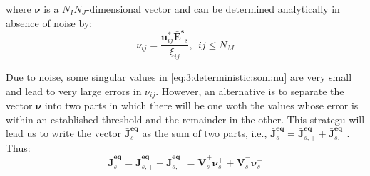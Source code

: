 			\noindent where $\boldsymbol{\nu}$ is a $N_IN_J$-dimensional vector and can be determined analytically in absence of noise by:
			\begin{equation}
				\nu_{ij} = \frac{\mathbf{u}^{\mathbf{*}}_{ij}\mathbf{\bar{E}^s}_s}{\xi_{ij}},~~ij\le N_M \label{eq:3:deterministic:som:nu}
			\end{equation}
		
			Due to noise, some singular values in \eqref{eq:3:deterministic:som:nu} are very small and lead to very large errors in $\nu_{ij}$. However, an alternative is to separate the vector $\boldsymbol{\nu}$ into two parts in which there will be one woth the values whose error is within an established threshold and the remainder in the other. This strategu will lead us to write the vector $\mathbf{\bar{J}}^{\mathbf{eq}}_s$ as the sum of two parts, i.e., $\mathbf{\bar{J}}^{\mathbf{eq}}_s = \mathbf{\bar{J}}^{\mathbf{eq}}_{s,+} + \mathbf{\bar{J}}^{\mathbf{eq}}_{s,-}$. Thus:
			\begin{equation}
				\mathbf{\bar{J}}^{\mathbf{eq}}_s = \mathbf{\bar{J}}^{\mathbf{eq}}_{s,+} + \mathbf{\bar{J}}^{\mathbf{eq}}_{s,-} = \mathbf{\bar{V}}^+_s\boldsymbol{\nu}^+_s + \mathbf{\bar{V}}^-_s\boldsymbol{\nu}^-_s \label{eq:3:deterministic:som:division}
			\end{equation}
		
